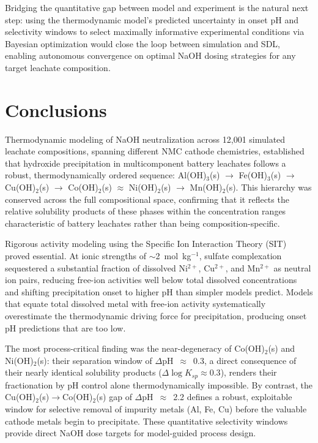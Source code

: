 \documentclass[final,2p,times]{elsarticle}
\begin{document}
Bridging the quantitative gap between model and experiment is the natural next step: using the thermodynamic model's predicted uncertainty in onset pH and selectivity windows to select maximally informative experimental conditions via Bayesian optimization would close the loop between simulation and SDL, enabling autonomous convergence on optimal NaOH dosing strategies for any target leachate composition.




\section{Conclusions}\label{sec:conclusions}

Thermodynamic modeling of NaOH neutralization across 12{,}001 simulated leachate compositions, spanning different NMC cathode chemistries, established that hydroxide precipitation in multicomponent battery leachates follows a robust, thermodynamically ordered sequence: Al(OH)$_3$(s) $\to$ Fe(OH)$_3$(s) $\to$ Cu(OH)$_2$(s) $\to$ Co(OH)$_2$(s) $\approx$ Ni(OH)$_2$(s) $\to$ Mn(OH)$_2$(s). This hierarchy was conserved across the full compositional space, confirming that it reflects the relative solubility products of these phases within the concentration ranges characteristic of battery leachates rather than being composition-specific.

Rigorous activity modeling using the Specific Ion Interaction Theory (SIT) proved essential. At ionic strengths of $\sim$2~mol~kg$^{-1}$, sulfate complexation sequestered a substantial fraction of dissolved Ni$^{2+}$, Cu$^{2+}$, and Mn$^{2+}$ as neutral ion pairs, reducing free-ion activities well below total dissolved concentrations and shifting precipitation onset to higher pH than simpler models predict. Models that equate total dissolved metal with free-ion activity systematically overestimate the thermodynamic driving force for precipitation, producing onset pH predictions that are too low.

The most process-critical finding was the near-degeneracy of Co(OH)$_2$(s) and Ni(OH)$_2$(s): their separation window of $\Delta$pH~$\approx$~0.3, a direct consequence of their nearly identical solubility products ($\Delta\log K_{sp} \approx 0.3$), renders their fractionation by pH control alone thermodynamically impossible. By contrast, the Cu(OH)$_2$(s)$\to$Co(OH)$_2$(s) gap of $\Delta$pH~$\approx$~2.2 defines a robust, exploitable window for selective removal of impurity metals (Al, Fe, Cu) before the valuable cathode metals begin to precipitate. These quantitative selectivity windows provide direct NaOH dose targets for model-guided process design.
\end{document}
